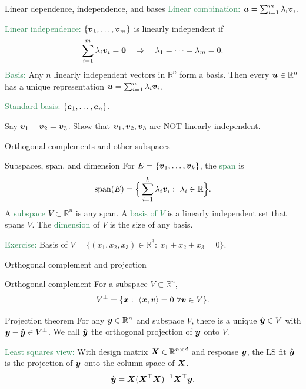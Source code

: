 \documentclass{beamer}
\begin{document}
\begin{frame}{Linear dependence, independence, and bases}
\textcolor{SeaGreen}{Linear combination:} $\boldsymbol u=\sum_{i=1}^m \lambda_i \boldsymbol v_i$.
\bigskip

\textcolor{SeaGreen}{Linear independence:} $\{\boldsymbol v_1,\ldots,\boldsymbol v_m\}$ is linearly independent if
\[
\sum_{i=1}^m \lambda_i \boldsymbol v_i=\boldsymbol 0 \quad\Rightarrow\quad \lambda_1=\cdots=\lambda_m=0.
\]
\textcolor{SeaGreen}{Basis:} Any $n$ linearly independent vectors in $\mathbb{R}^n$ form a basis. Then every $\boldsymbol u\in\mathbb{R}^n$ has a \alert{unique} representation $\boldsymbol u=\sum_{i=1}^n \lambda_i \boldsymbol v_i$.
\bigskip

\textcolor{SeaGreen}{Standard basis:} $\{\boldsymbol e_1,\ldots,\boldsymbol e_n\}$.
\begin{alertblock}{}
	Say $\boldsymbol v_1+\boldsymbol v_2=\boldsymbol v_3$. Show that $\boldsymbol v_1,\boldsymbol v_2,\boldsymbol v_3$ are NOT linearly independent.
\end{alertblock}
\end{frame}


\begin{frame} \begin{center}
	\alert{\Huge Orthogonal complements and other subspaces}
\end{center}\end{frame}

\begin{frame}{Subspaces, span, and dimension}
For $E=\{\boldsymbol v_1,\ldots,\boldsymbol v_k\}$, the \textcolor{SeaGreen}{span} is
\[
\mathrm{span}(E)=\Big\{\sum_{i=1}^k \lambda_i \boldsymbol v_i:\ \lambda_i\in\mathbb{R}\Big\}.
\]
A \textcolor{SeaGreen}{subspace} $V\subset\mathbb{R}^n$ is any span. A \textcolor{SeaGreen}{basis of $V$} is a linearly independent set that spans $V$.
The \textcolor{SeaGreen}{dimension} of $V$ is the size of any basis.
\bigskip

\textcolor{SeaGreen}{Exercise:} Basis of $V=\{(x_1,x_2,x_3)\in\mathbb{R}^3:\ x_1+x_2+x_3=0\}$.
\end{frame}



\begin{frame}[label=orthogonal]{Orthogonal complement and projection}
\begin{block}{Orthogonal complement}
For a subspace $V\subset\mathbb{R}^n$,
\[
V^\perp=\{\boldsymbol x:\ \langle \boldsymbol x,\boldsymbol v\rangle=0\ \forall \boldsymbol v\in V\}.
\]
\end{block}
\begin{alertblock}{Projection theorem}
For any $\boldsymbol y\in\mathbb{R}^n$ and subspace $V$, there is a unique $\hat{\boldsymbol y}\in V$ with $\boldsymbol y-\hat{\boldsymbol y}\in V^\perp$. We call $\hat{\boldsymbol y}$ the orthogonal projection of $\boldsymbol y$ onto $V$.
\end{alertblock}

\textcolor{SeaGreen}{Least squares view:} With design matrix $\boldsymbol X\in\mathbb{R}^{n\times d}$ and response $\boldsymbol y$, the LS fit $\hat{\boldsymbol y}$ is the projection of $\boldsymbol y$ onto the column space of $\boldsymbol X$.
\[
\hat{\boldsymbol y}=\boldsymbol X(\boldsymbol X^\top\boldsymbol X)^{-1}\boldsymbol X^\top\boldsymbol y.
\]
\end{frame}
\end{document}
